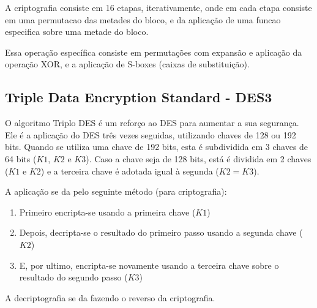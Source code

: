 A criptografia consiste em 16 etapas, iterativamente, onde em cada etapa consiste em uma permutacao das metades do bloco, e da aplicação de uma funcao especifica sobre uma metade do bloco.

Essa operação específica consiste em permutações com expansão e aplicação da operação XOR, e a aplicação de S-boxes (caixas de substituição).

\subsection{Triple Data Encryption Standard - DES3}

O algoritmo Triplo DES é um reforço ao DES para aumentar a sua segurança. Ele é a aplicação do DES três vezes seguidas, utilizando chaves de 128 ou 192 bits. Quando se utiliza uma chave de 192 bits, esta é subdividida em 3 chaves de 64 bits ($K1$, $K2$ e $K3$). Caso a chave seja de 128 bits, está é dividida em 2 chaves ($K1$ e $K2$) e a terceira chave é adotada igual à segunda ($K2=K3$).

A aplicação se da pelo seguinte método (para criptografia)\cite{stallings2011cryptography}:
\begin{enumerate}
\item Primeiro encripta-se usando a primeira chave ($K1$)
\item Depois, decripta-se o resultado do primeiro passo usando a segunda chave ($K2$)
\item E, por ultimo, encripta-se novamente usando a terceira chave sobre o resultado do segundo passo ($K3$)
\end{enumerate}

A decriptografia se da fazendo o reverso da criptografia.